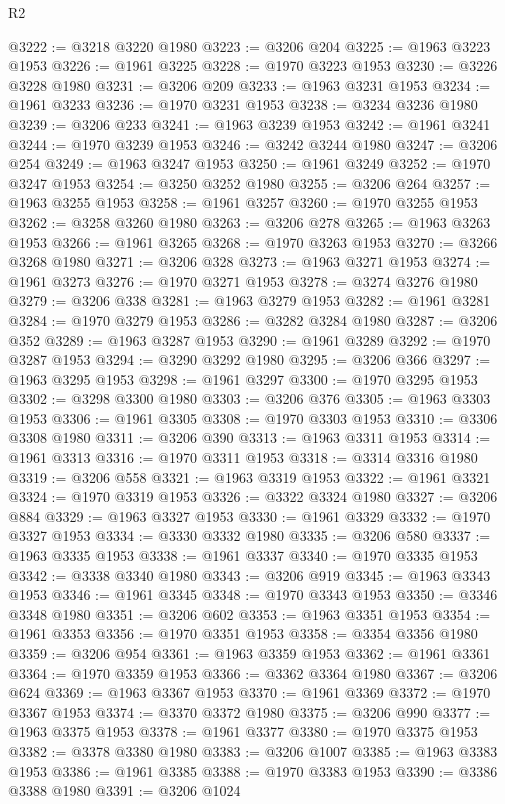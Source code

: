 \begin{lexlean}{R2}
\begin{coremodule}
@3222 := @3218 @3220 @1980
@3223 := @3206 @204
@3225 := @1963 @3223 @1953
@3226 := @1961 @3225
@3228 := @1970 @3223 @1953
@3230 := @3226 @3228 @1980
@3231 := @3206 @209
@3233 := @1963 @3231 @1953
@3234 := @1961 @3233
@3236 := @1970 @3231 @1953
@3238 := @3234 @3236 @1980
@3239 := @3206 @233
@3241 := @1963 @3239 @1953
@3242 := @1961 @3241
@3244 := @1970 @3239 @1953
@3246 := @3242 @3244 @1980
@3247 := @3206 @254
@3249 := @1963 @3247 @1953
@3250 := @1961 @3249
@3252 := @1970 @3247 @1953
@3254 := @3250 @3252 @1980
@3255 := @3206 @264
@3257 := @1963 @3255 @1953
@3258 := @1961 @3257
@3260 := @1970 @3255 @1953
@3262 := @3258 @3260 @1980
@3263 := @3206 @278
@3265 := @1963 @3263 @1953
@3266 := @1961 @3265
@3268 := @1970 @3263 @1953
@3270 := @3266 @3268 @1980
@3271 := @3206 @328
@3273 := @1963 @3271 @1953
@3274 := @1961 @3273
@3276 := @1970 @3271 @1953
@3278 := @3274 @3276 @1980
@3279 := @3206 @338
@3281 := @1963 @3279 @1953
@3282 := @1961 @3281
@3284 := @1970 @3279 @1953
@3286 := @3282 @3284 @1980
@3287 := @3206 @352
@3289 := @1963 @3287 @1953
@3290 := @1961 @3289
@3292 := @1970 @3287 @1953
@3294 := @3290 @3292 @1980
@3295 := @3206 @366
@3297 := @1963 @3295 @1953
@3298 := @1961 @3297
@3300 := @1970 @3295 @1953
@3302 := @3298 @3300 @1980
@3303 := @3206 @376
@3305 := @1963 @3303 @1953
@3306 := @1961 @3305
@3308 := @1970 @3303 @1953
@3310 := @3306 @3308 @1980
@3311 := @3206 @390
@3313 := @1963 @3311 @1953
@3314 := @1961 @3313
@3316 := @1970 @3311 @1953
@3318 := @3314 @3316 @1980
@3319 := @3206 @558
@3321 := @1963 @3319 @1953
@3322 := @1961 @3321
@3324 := @1970 @3319 @1953
@3326 := @3322 @3324 @1980
@3327 := @3206 @884
@3329 := @1963 @3327 @1953
@3330 := @1961 @3329
@3332 := @1970 @3327 @1953
@3334 := @3330 @3332 @1980
@3335 := @3206 @580
@3337 := @1963 @3335 @1953
@3338 := @1961 @3337
@3340 := @1970 @3335 @1953
@3342 := @3338 @3340 @1980
@3343 := @3206 @919
@3345 := @1963 @3343 @1953
@3346 := @1961 @3345
@3348 := @1970 @3343 @1953
@3350 := @3346 @3348 @1980
@3351 := @3206 @602
@3353 := @1963 @3351 @1953
@3354 := @1961 @3353
@3356 := @1970 @3351 @1953
@3358 := @3354 @3356 @1980
@3359 := @3206 @954
@3361 := @1963 @3359 @1953
@3362 := @1961 @3361
@3364 := @1970 @3359 @1953
@3366 := @3362 @3364 @1980
@3367 := @3206 @624
@3369 := @1963 @3367 @1953
@3370 := @1961 @3369
@3372 := @1970 @3367 @1953
@3374 := @3370 @3372 @1980
@3375 := @3206 @990
@3377 := @1963 @3375 @1953
@3378 := @1961 @3377
@3380 := @1970 @3375 @1953
@3382 := @3378 @3380 @1980
@3383 := @3206 @1007
@3385 := @1963 @3383 @1953
@3386 := @1961 @3385
@3388 := @1970 @3383 @1953
@3390 := @3386 @3388 @1980
@3391 := @3206 @1024

\end{coremodule}
\end{lexlean}
